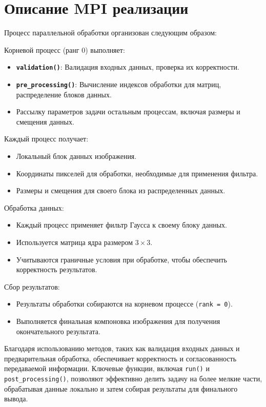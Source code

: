 \documentclass[14pt]{extarticle}
\theoremstyle{definition}
\theoremstyle{remark}
\begin{document}
\clearpage
\section{Описание MPI реализации}
Процесс параллельной обработки организован следующим образом:

Корневой процесс (ранг 0) выполняет:
\begin{itemize}
    \item \textbf{\texttt{validation()}}: Валидация входных данных, проверка их корректности.
    \item \textbf{\texttt{pre\_processing()}}: Вычисление индексов обработки для матриц, распределение блоков данных.
    \item Рассылку параметров задачи остальным процессам, включая размеры и смещения данных.\\
\end{itemize}

Каждый процесс получает:
\begin{itemize}
    \item Локальный блок данных изображения.
    \item Координаты пикселей для обработки, необходимые для применения фильтра.
    \item Размеры и смещения для своего блока из распределенных данных.\\
\end{itemize}

Обработка данных:
\begin{itemize}
    \item Каждый процесс применяет фильтр Гаусса к своему блоку данных.
    \item Используется матрица ядра размером $3 \times 3$.
    \item Учитываются граничные условия при обработке, чтобы обеспечить корректность результатов.\\
\end{itemize}

Сбор результатов:
\begin{itemize}
    \item Результаты обработки собираются на корневом процессе (\texttt{rank = 0}).
    \item Выполняется финальная компоновка изображения для получения окончательного результата.\\
\end{itemize}

Благодаря использованию методов, таких как валидация входных данных и предварительная обработка, обеспечивает корректность и согласованность передаваемой информации. Ключевые функции, включая \texttt{run()} и \texttt{post\_processing()}, позволяют эффективно делить задачу на более мелкие части, обрабатывая данные локально и затем собирая результаты для финального вывода.
\end{document}
